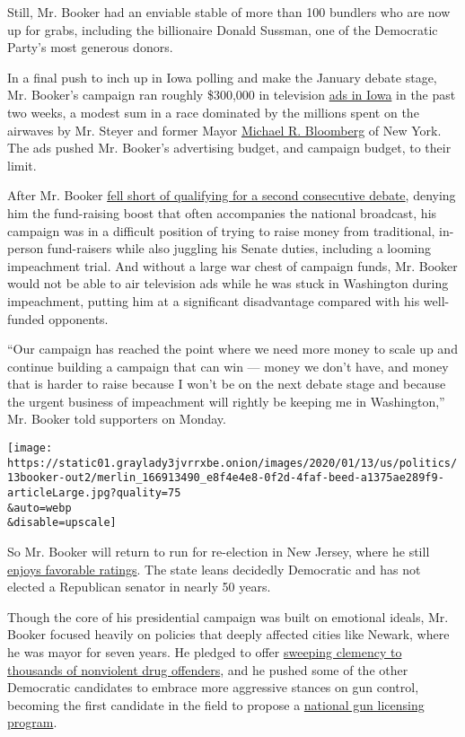 Still, Mr. Booker had an enviable stable of more than 100 bundlers who
are now up for grabs, including the billionaire Donald Sussman, one of
the Democratic Party's most generous donors.

In a final push to inch up in Iowa polling and make the January debate
stage, Mr. Booker's campaign ran roughly \$300,000 in television
\href{https://www.youtube.com/watch?v=CBybCrdTv_U}{ads in Iowa} in the
past two weeks, a modest sum in a race dominated by the millions spent
on the airwaves by Mr. Steyer and former Mayor
\href{https://www.nytimes3xbfgragh.onion/interactive/2020/us/elections/michael-bloomberg.html}{Michael
R. Bloomberg} of New York. The ads pushed Mr. Booker's advertising
budget, and campaign budget, to their limit.

After Mr. Booker
\href{https://www.nytimes3xbfgragh.onion/interactive/2019/us/politics/democratic-debate-lineup.html}{fell
short of qualifying for a second consecutive debate}, denying him the
fund-raising boost that often accompanies the national broadcast, his
campaign was in a difficult position of trying to raise money from
traditional, in-person fund-raisers while also juggling his Senate
duties, including a looming impeachment trial. And without a large war
chest of campaign funds, Mr. Booker would not be able to air television
ads while he was stuck in Washington during impeachment, putting him at
a significant disadvantage compared with his well-funded opponents.

``Our campaign has reached the point where we need more money to scale
up and continue building a campaign that can win --- money we don't
have, and money that is harder to raise because I won't be on the next
debate stage and because the urgent business of impeachment will rightly
be keeping me in Washington,'' Mr. Booker told supporters on Monday.

\texttt{[image: https://static01.graylady3jvrrxbe.onion/images/2020/01/13/us/politics/13booker-out2/merlin\_166913490\_e8f4e4e8-0f2d-4faf-beed-a1375ae289f9-articleLarge.jpg?quality=75\\\&auto=webp\\\&disable=upscale]}

So Mr. Booker will return to run for re-election in New Jersey, where he
still
\href{https://www.monmouth.edu/polling-institute/reports/monmouthpoll_nj_091919/}{enjoys
favorable ratings}. The state leans decidedly Democratic and has not
elected a Republican senator in nearly 50 years.

Though the core of his presidential campaign was built on emotional
ideals, Mr. Booker focused heavily on policies that deeply affected
cities like Newark, where he was mayor for seven years. He pledged to
offer
\href{https://www.nytimes3xbfgragh.onion/2019/06/20/us/politics/booker-drugs-clemency.html}{sweeping
clemency to thousands of nonviolent drug offenders}, and he pushed some
of the other Democratic candidates to embrace more aggressive stances on
gun control, becoming the first candidate in the field to propose a
\href{https://www.nytimes3xbfgragh.onion/2019/05/06/us/politics/cory-booker-gun-control.html}{national
gun licensing program}.

